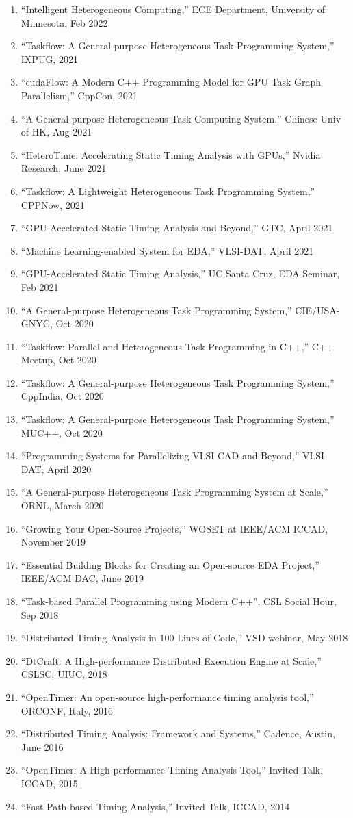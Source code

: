 \documentclass[A4,11pt]{article}
\begin{document}
\begin{enumerate}
  \item ``Intelligent Heterogeneous Computing,'' ECE Department, University of Minnesota, Feb 2022
  \item ``Taskflow: A General-purpose Heterogeneous Task Programming System,'' IXPUG, 2021
  \item ``cudaFlow: A Modern C++ Programming Model for GPU Task Graph Parallelism,'' CppCon, 2021
  \item ``A General-purpose Heterogeneous Task Computing System,'' Chinese Univ of HK, Aug 2021
  \item ``HeteroTime: Accelerating Static Timing Analysis with GPUs,'' Nvidia Research, June 2021
  \item ``Taskflow: A Lightweight Heterogeneous Task Programming System,'' CPPNow, 2021
  \item ``GPU-Accelerated Static Timing Analysis and Beyond,'' GTC, April 2021
  \item ``Machine Learning-enabled System for EDA,'' VLSI-DAT, April 2021
  \item ``GPU-Accelerated Static Timing Analysis,'' UC Santa Cruz, EDA Seminar, Feb 2021 
  \item ``A General-purpose Heterogeneous Task Programming System,'' CIE/USA-GNYC, Oct 2020
  \item ``Taskflow: Parallel and Heterogeneous Task Programming in C++,'' C++ Meetup, Oct 2020
  \item ``Taskflow: A General-purpose Heterogeneous Task Programming System,'' CppIndia, Oct 2020
  \item ``Taskflow: A General-purpose Heterogeneous Task Programming System,'' MUC++, Oct 2020
  \item ``Programming Systems for Parallelizing VLSI CAD and Beyond,'' VLSI-DAT, April 2020
  \item ``A General-purpose Heterogeneous Task Programming System at Scale,'' ORNL, March 2020
  \item ``Growing Your Open-Source Projects,'' WOSET at IEEE/ACM ICCAD, November 2019
  \item ``Essential Building Blocks for Creating an Open-source EDA Project,'' IEEE/ACM DAC, June 2019
  \item ``Task-based Parallel Programming using Modern C++'', CSL Social Hour, Sep 2018
  \item ``Distributed Timing Analysis in 100 Lines of Code,'' VSD webinar, May 2018
  \item ``DtCraft: A High-performance Distributed Execution Engine at Scale,'' CSLSC, UIUC, 2018
  \item ``OpenTimer: An open-source high-performance timing analysis tool,'' ORCONF, Italy, 2016
  \item ``Distributed Timing Analysis: Framework and Systems,'' Cadence, Austin, June 2016
  \item ``OpenTimer: A High-performance Timing Analysis Tool,'' Invited Talk, ICCAD, 2015
  \item ``Fast Path-based Timing Analysis,'' Invited Talk, ICCAD, 2014

 \end{enumerate}
\end{document}
